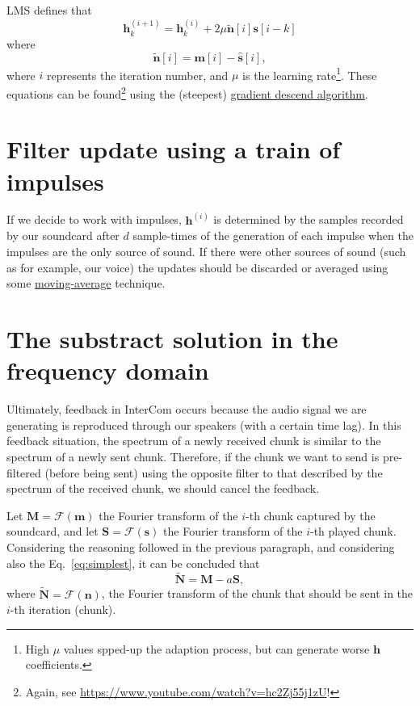 LMS defines that
\begin{equation}
  {\mathbf h}^{(i+1)}_k = {\mathbf h}^{(i)}_k + 2\mu\tilde{\mathbf n}[i]{\mathbf s}[i-k] \label{eq:update}
\end{equation}
where
\begin{equation}
  \tilde{\mathbf n}[i] = {\mathbf m}[i] - \hat{\mathbf s}[i],
\end{equation}
where $i$ represents the iteration number, and $\mu$ is the learning
rate\footnote{High $\mu$ values spped-up the adaption process, but can
  generate worse $\mathbf{h}$ coefficients.}.  These equations can be
found\footnote{Again, see
  \url{https://www.youtube.com/watch?v=hc2Zj55j1zU}!} using the
(steepest)
\href{https://en.wikipedia.org/wiki/Gradient_descent}{gradient descend
  algorithm}.

\section{Filter update using a train of impulses}
If we decide to work with impulses, ${\mathbf h}^{(i)}$ is determined
by the samples recorded by our soundcard after $d$ sample-times of the
generation of each impulse when the impulses are the only source of
sound. If there were other sources of sound (such as for example, our
voice) the updates should be discarded or averaged using some
\href{https://en.wikipedia.org/wiki/Moving_average}{moving-average}
technique.

\section{The substract solution in the frequency domain}
Ultimately, feedback in InterCom occurs because the audio signal we
are generating is reproduced through our speakers (with a certain time
lag). In this feedback situation, the spectrum of a newly received
chunk is similar to the spectrum of a newly sent chunk. Therefore, if
the chunk we want to send is pre-filtered (before being sent) using
the opposite filter to that described by the spectrum of the received
chunk, we should cancel the feedback.

Let ${\mathbf M} = {\mathcal F}({\mathbf m})$ the Fourier transform of
the $i$-th chunk captured by the soundcard, and let
${\mathbf S} = {\mathcal F}({\mathbf s})$ the Fourier transform of the
$i$-th played chunk. Considering the reasoning followed in the
previous paragraph, and considering also the Eq.~\eqref{eq:simplest}, it can be concluded that
\begin{equation}
  \tilde{\mathbf N} = {\mathbf M} - a{\mathbf S},
  \label{eq:simplest_fourier}
\end{equation}
where $\tilde{\mathbf N} = {\mathcal F}({\mathbf n})$, the Fourier
transform of the chunk that should be sent in the $i$-th iteration
(chunk).

